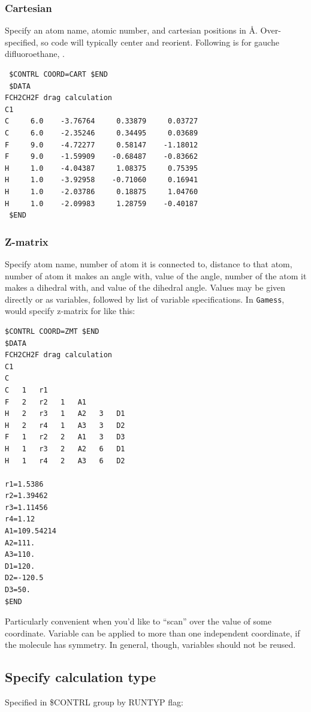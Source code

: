 \documentclass[11pt]{article}
\begin{document}
\subsubsection{Cartesian}
\label{sec:orgd3b902a}
Specify an atom name, atomic number, and cartesian positions in \AA{}.  Over-specified, so code will typically center and reorient.  Following is for gauche difluoroethane, .
\begin{verbatim}
 $CONTRL COORD=CART $END
 $DATA
FCH2CH2F drag calculation
C1
C     6.0    -3.76764     0.33879     0.03727
C     6.0    -2.35246     0.34495     0.03689
F     9.0    -4.72277     0.58147    -1.18012
F     9.0    -1.59909    -0.68487    -0.83662
H     1.0    -4.04387     1.08375     0.75395
H     1.0    -3.92958    -0.71060     0.16941
H     1.0    -2.03786     0.18875     1.04760
H     1.0    -2.09983     1.28759    -0.40187
 $END
\end{verbatim}

\subsubsection{Z-matrix}
\label{sec:org71f20bd}
Specify atom name, number of atom it is connected to, distance to that atom, number of atom it makes an angle with, value of the angle, number of the atom it makes a dihedral with, and value of the dihedral angle.  Values may be given directly or as variables, followed by list of variable specifications.  In \texttt{Gamess}, would specify z-matrix for  like this:
\begin{verbatim}
$CONTRL COORD=ZMT $END
$DATA
FCH2CH2F drag calculation
C1
C
C   1   r1
F   2   r2   1   A1
H   2   r3   1   A2   3   D1
H   2   r4   1   A3   3   D2
F   1   r2   2   A1   3   D3
H   1   r3   2   A2   6   D1
H   1   r4   2   A3   6   D2

r1=1.5386
r2=1.39462
r3=1.11456
r4=1.12
A1=109.54214
A2=111.
A3=110.
D1=120.
D2=-120.5
D3=50.
$END
\end{verbatim}
Particularly convenient when you'd like to ``scan'' over the value of some coordinate.  Variable can be applied to more than one independent coordinate, if the molecule has symmetry.  In general, though, variables should not be reused.

\subsection{Specify calculation type}
\label{sec:org461a2c4}
Specified in \$CONTRL group by RUNTYP flag:
\end{document}
